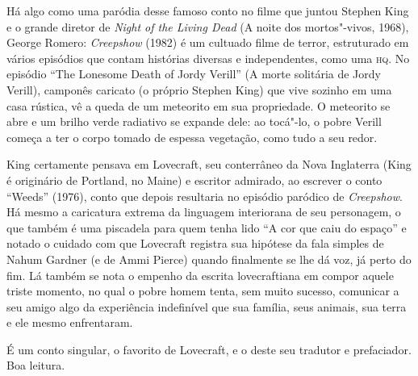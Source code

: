 Há algo como uma paródia desse famoso conto no filme que juntou Stephen
King e o grande diretor de \emph{Night of the Living Dead} (A noite dos
mortos"-vivos, 1968), George Romero: \emph{Creepshow} (1982) é um
cultuado filme de terror, estruturado em vários episódios que contam
histórias diversas e independentes, como uma \textsc{hq}. No episódio ``The
Lonesome Death of Jordy Verill'' (A morte solitária de Jordy Verill),
camponês caricato (o próprio Stephen King) que vive sozinho em uma casa
rústica, vê a queda de um meteorito em sua propriedade. O meteorito se
abre e um brilho verde radiativo se expande dele: ao tocá"-lo, o pobre
Verill começa a ter o corpo tomado de espessa vegetação, como tudo a seu
redor.

King certamente pensava em Lovecraft, seu conterrâneo da Nova Inglaterra
(King é originário de Portland, no Maine) e escritor admirado, ao
escrever o conto ``Weeds'' (1976), conto que depois resultaria no
episódio paródico de \emph{Creepshow}. Há mesmo a caricatura extrema da
linguagem interiorana de seu personagem, o que também é uma piscadela
para quem tenha lido ``A cor que caiu do espaço'' e notado o cuidado com
que Lovecraft registra sua hipótese da fala simples de Nahum Gardner (e
de Ammi Pierce) quando finalmente se lhe dá voz, já perto do fim. Lá
também se nota o empenho da escrita lovecraftiana em compor aquele
triste momento, no qual o pobre homem tenta, sem muito sucesso,
comunicar a seu amigo algo da experiência indefinível que sua família,
seus animais, sua terra e ele mesmo enfrentaram.

É um conto singular, o favorito de Lovecraft, e o deste seu tradutor e
prefaciador. Boa leitura.
